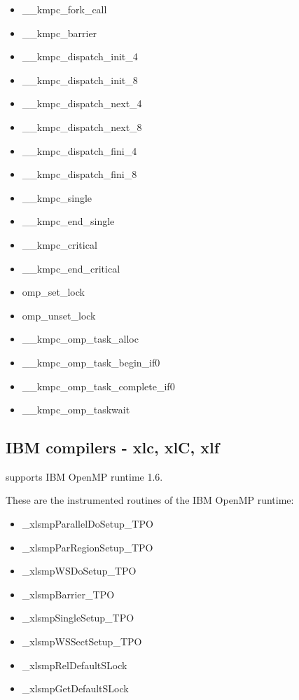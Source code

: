 \begin{itemize}
\item \_\_kmpc\_fork\_call
\item \_\_kmpc\_barrier
\item \_\_kmpc\_dispatch\_init\_4
\item \_\_kmpc\_dispatch\_init\_8
\item \_\_kmpc\_dispatch\_next\_4
\item \_\_kmpc\_dispatch\_next\_8
\item \_\_kmpc\_dispatch\_fini\_4
\item \_\_kmpc\_dispatch\_fini\_8
\item \_\_kmpc\_single
\item \_\_kmpc\_end\_single
\item \_\_kmpc\_critical\footnotemark[4]
\item \_\_kmpc\_end\_critical\footnotemark[4]
\item omp\_set\_lock\footnotemark[4]
\item omp\_unset\_lock\footnotemark[4]
\item \_\_kmpc\_omp\_task\_alloc
\item \_\_kmpc\_omp\_task\_begin\_if0
\item \_\_kmpc\_omp\_task\_complete\_if0
\item \_\_kmpc\_omp\_taskwait
\end{itemize}

\subsection{IBM compilers - xlc, xlC, xlf}

\TRACE supports IBM OpenMP runtime 1.6.

These are the instrumented routines of the IBM OpenMP runtime:

\begin{itemize}
\item \_xlsmpParallelDoSetup\_TPO
\item \_xlsmpParRegionSetup\_TPO
\item \_xlsmpWSDoSetup\_TPO
\item \_xlsmpBarrier\_TPO
\item \_xlsmpSingleSetup\_TPO
\item \_xlsmpWSSectSetup\_TPO
\item \_xlsmpRelDefaultSLock\footnotemark[4]
\item \_xlsmpGetDefaultSLock\footnotemark[4]
\end{itemize}

